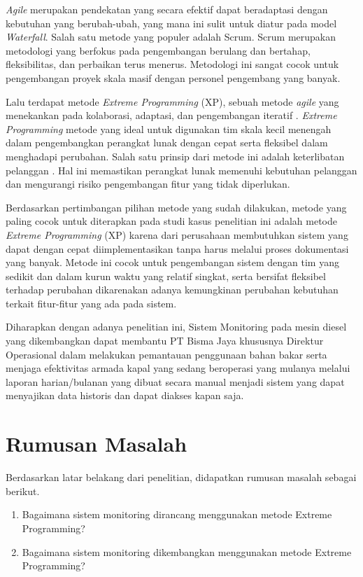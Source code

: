 \textit{Agile} merupakan pendekatan yang secara efektif dapat beradaptasi dengan kebutuhan yang berubah-ubah, yang mana ini sulit untuk diatur pada model \textit{Waterfall}. Salah satu metode yang populer adalah Scrum. Scrum merupakan metodologi yang berfokus pada pengembangan berulang dan bertahap, fleksibilitas, dan perbaikan terus menerus. Metodologi ini sangat cocok untuk pengembangan proyek skala masif dengan personel pengembang yang banyak.

Lalu terdapat metode \textit{Extreme Programming} (XP), sebuah metode \textit{agile} yang menekankan pada kolaborasi, adaptasi, dan pengembangan iteratif \parencite{article:matharu}. \textit{Extreme Programming} metode yang ideal untuk digunakan tim skala kecil menengah dalam pengembangkan perangkat lunak dengan cepat serta fleksibel dalam menghadapi perubahan. Salah satu prinsip dari metode ini adalah keterlibatan pelanggan \parencite{article:matharu}. Hal ini memastikan perangkat lunak memenuhi kebutuhan pelanggan dan mengurangi risiko pengembangan fitur yang tidak diperlukan.

Berdasarkan pertimbangan pilihan metode yang sudah dilakukan, metode yang paling cocok untuk diterapkan pada studi kasus penelitian ini adalah metode \textit{Extreme Programming} (XP) karena dari perusahaan membutuhkan sistem yang dapat dengan cepat diimplementasikan tanpa harus melalui proses dokumentasi yang banyak. Metode ini cocok untuk pengembangan sistem dengan tim yang sedikit dan dalam kurun waktu yang relatif singkat, serta bersifat fleksibel terhadap perubahan dikarenakan adanya kemungkinan perubahan kebutuhan terkait fitur-fitur yang ada pada sistem.

Diharapkan dengan adanya penelitian ini, Sistem Monitoring pada mesin diesel yang dikembangkan dapat membantu PT Bisma Jaya khususnya Direktur Operasional dalam melakukan pemantauan penggunaan bahan bakar serta menjaga efektivitas armada kapal yang sedang beroperasi yang mulanya melalui laporan harian/bulanan yang dibuat secara manual menjadi sistem yang dapat menyajikan data historis dan dapat diakses kapan saja.



\section{Rumusan Masalah}

\noindent Berdasarkan latar belakang dari penelitian, didapatkan rumusan masalah sebagai berikut.

\begin{enumerate}
    \item Bagaimana sistem monitoring dirancang menggunakan metode Extreme Programming?
    \item Bagaimana sistem monitoring dikembangkan menggunakan metode Extreme Programming?
\end{enumerate}

